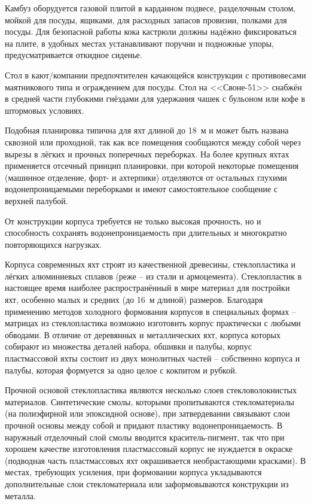 Камбуз оборудуется газовой плитой в карданном подвесе, разделочным
столом, мойкой для посуды, ящиками, для расходных запасов провизии,
полками для посуды. Для безопасной работы кока кастрюли должны надёжно
фиксироваться на плите, в удобных местах устанавливают поручни и
подножные упоры, предусматривается откидное сиденье.

Стол в кают\-/компании предпочтителен качающейся конструкции с
противовесами маятникового типа и ограждением для посуды. Стол на
<<Своне-51>> снабжён в средней части глубокими гнёздами для удержания
чашек с бульоном или кофе в штормовых условиях.

Подобная планировка типична для яхт длиной до 18~м и может быть
названа сквозной или проходной, так как все помещения сообщаются между
собой через вырезы в лёгких и прочных поперечных переборках. На более
крупных яхтах применяется отсечный принцип планировки, при которой
некоторые помещения (машинное отделение, форт- и ахтерпики) отделяются
от остальных глухими водонепроницаемыми переборками и имеют
самостоятельное сообщение с верхней палубой.

От конструкции корпуса требуется не только высокая прочность, но и
способность сохранять водонепроницаемость при длительных и многократно
повторяющихся нагрузках.

Корпуса современных яхт строят из качественной древесины,
стеклопластика и лёгких алюминиевых сплавов (реже \--- из стали и
армоцемента). Стеклопластик в настоящее время наиболее
распространённый в мире материал для постройки яхт, особенно малых и
средних (до 16~м длиной) размеров. Благодаря применению методов
холодного формования корпусов в специальных формах \--- матрицах из
стеклопластика возможно изготовить корпус практически с любыми
обводами. В отличие от деревянных и металлических яхт, корпуса которых
собирают из множества деталей набора, обшивки и палубы, корпус
пластмассовой яхты состоит из двух монолитных частей \--- собственно
корпуса и палубы, которая формуется за одно целое с кокпитом и рубкой.

Прочной основой стеклопластика являются несколько слоев
стекловолокнистых материалов. Синтетические смолы, которыми
пропитываются стекломатериалы (на полиэфирной или эпоксидной основе),
при затвердевании связывают слои прочной основы между собой и придают
пластику водонепроницаемость. В наружный отделочный слой смолы
вводится краситель-пигмент, так что при хорошем качестве изготовления
пластмассовый корпус не нуждается в окраске (подводная часть
пластмассовых яхт окрашивается необрастающими красками). В местах,
требующих усиления, при формовании корпуса укладываются дополнительные
слои стекломатериала или заформовываются конструкции из металла.


